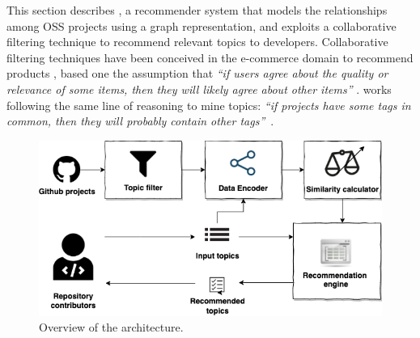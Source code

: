 This section describes \TF, %
a recommender system %
that models the relationships among OSS projects using a graph representation, and exploits a collaborative filtering technique \cite{Schafer:2007:CFR:1768197.1768208} to recommend relevant \GH topics to developers. Collaborative filtering techniques have been conceived in the e-commerce domain %
to recommend products %
\cite{Linden:2003:ARI:642462.642471}, based one the assumption that \emph{``if users agree about the quality or relevance of some items, then they will likely agree about other items''} \cite{Schafer:2007:CFR:1768197.1768208}. 
\TF works %
following the same line of reasoning to mine \GH topics: \emph{``if projects have some tags in common, then they will probably contain other tags''}~\cite{NGUYEN2020110460}.

\begin{figure}[t!]
	\centering
	\includegraphics[width=\linewidth]{figs/TopFilter.png}
	\caption{Overview of the \TF architecture.}%
	\label{fig:TopFilterArchitecture}
\end{figure}

